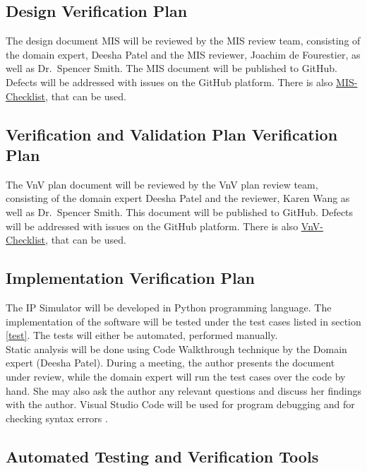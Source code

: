 \documentclass[12pt, titlepage]{article}
\begin{document}
\subsection{Design Verification Plan}

The design document MIS will be reviewed by the MIS review team, consisting of the domain expert, Deesha Patel and the MIS reviewer, Joachim de Fourestier, as well as Dr.\ Spencer Smith.
The MIS document will be published to GitHub. Defects will be addressed with issues on the GitHub platform. There is also \href{https://github.com/smiths/capTemplate/blob/main/docs/Checklists/MIS-Checklist.pdf}{MIS-Checklist}, that can be used.

\subsection{Verification and Validation Plan Verification Plan}
The VnV plan document will be reviewed by the VnV plan review team, consisting of the domain expert Deesha Patel and the reviewer, Karen Wang as well as Dr.\ Spencer Smith.
This document will be published to GitHub. Defects will be addressed with issues on the GitHub platform.
There is also \href{https://github.com/smiths/capTemplate/blob/main/docs/Checklists/VnV-Checklist.pdf}{VnV-Checklist}, that can be used.

\subsection{Implementation Verification Plan}

The IP Simulator will be developed in Python programming language. The implementation of the software will be tested under the test cases listed in section \ref{test}. The tests will either be automated, performed manually. \\
Static analysis will be done using Code Walkthrough technique by the Domain expert (Deesha Patel). During a meeting, the author presents the document under review, while the domain expert will run the test cases over the code by hand. She may also ask the author any relevant questions and discuss her findings with the author. Visual Studio Code will be used for program debugging and for checking syntax errors \cite{codeWalkThrough}. \\
 
\subsection{Automated Testing and Verification Tools}
\end{document}
